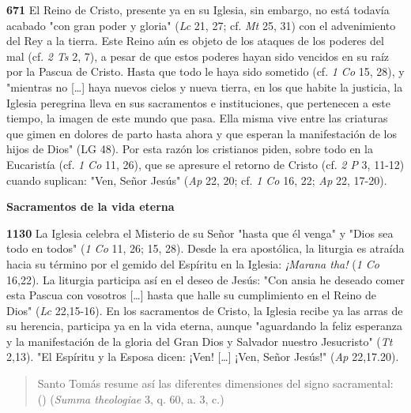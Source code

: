 \documentclass[]{article}
\begin{document}
\textbf{671} El Reino de Cristo, presente ya en su Iglesia, sin embargo, no está todavía acabado "con gran poder y gloria" (\emph{Lc} 21, 27; cf. \emph{Mt} 25, 31) con el advenimiento del Rey a la tierra. Este Reino aún es objeto de los ataques de los poderes del mal (cf. \emph{2 Ts} 2, 7), a pesar de que estos poderes hayan sido vencidos en su raíz por la Pascua de Cristo. Hasta que todo le haya sido sometido (cf. \emph{1 Co} 15, 28), y "mientras no [\ldots{}] haya nuevos cielos y nueva tierra, en los que habite la justicia, la Iglesia peregrina lleva en sus sacramentos e instituciones, que pertenecen a este tiempo, la imagen de este mundo que pasa. Ella misma vive entre las criaturas que gimen en dolores de parto hasta ahora y que esperan la manifestación de los hijos de Dios" (LG 48). Por esta razón los cristianos piden, sobre todo en la Eucaristía (cf. \emph{1 Co} 11, 26), que se apresure el retorno de Cristo (cf. \emph{2 P} 3, 11-12) cuando suplican: "Ven, Señor Jesús" (\emph{Ap} 22, 20; cf. \emph{1 Co} 16, 22; \emph{Ap} 22, 17-20).

\textbf{Sacramentos de la vida eterna}

\textbf{1130} La Iglesia celebra el Misterio de su Señor "hasta que él venga" y "Dios sea todo en todos" (\emph{1 Co} 11, 26; 15, 28). Desde la era apostólica, la liturgia es atraída hacia su término por el gemido del Espíritu en la Iglesia: \emph{¡Marana tha!} (\emph{1 Co} 16,22). La liturgia participa así en el deseo de Jesús: "Con ansia he deseado comer esta Pascua con vosotros [\ldots{}] hasta que halle su cumplimiento en el Reino de Dios" (\emph{Lc} 22,15-16). En los sacramentos de Cristo, la Iglesia recibe ya las arras de su herencia, participa ya en la vida eterna, aunque "aguardando la feliz esperanza y la manifestación de la gloria del Gran Dios y Salvador nuestro Jesucristo" (\emph{Tt} 2,13). "El Espíritu y la Esposa dicen: ¡Ven! [\ldots{}] ¡Ven, Señor Jesús!" (\emph{Ap} 22,17.20).

\begin{quote} 	Santo Tomás resume así las diferentes dimensiones del signo sacramental: 	 () (\emph{Summa theologiae} 3, q. 60, 	a. 3, c.) \end{quote}
\end{document}
